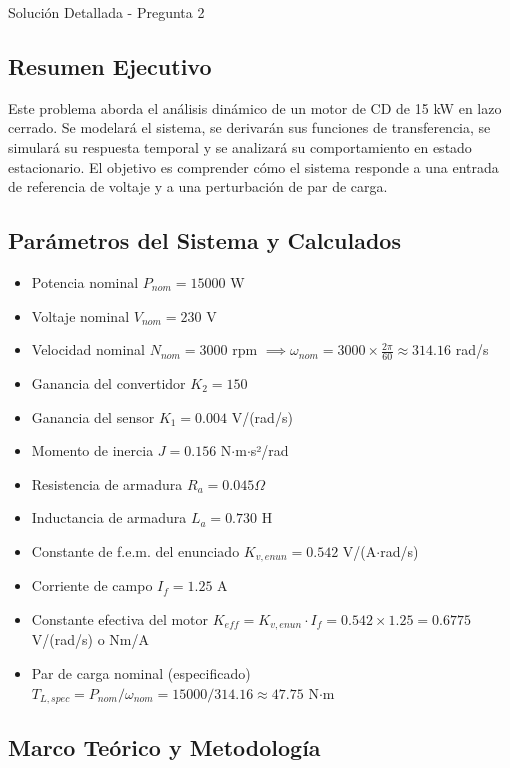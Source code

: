 \documentclass[12pt]{article}
\begin{document}
\begin{solutionbox}{Solución Detallada - Pregunta 2}

\subsection*{Resumen Ejecutivo}
Este problema aborda el análisis dinámico de un motor de CD de 15 kW en lazo cerrado. Se modelará el sistema, se derivarán sus funciones de transferencia, se simulará su respuesta temporal y se analizará su comportamiento en estado estacionario. El objetivo es comprender cómo el sistema responde a una entrada de referencia de voltaje y a una perturbación de par de carga.

\subsection*{Parámetros del Sistema y Calculados}
\begin{itemize}
    \item Potencia nominal $P_{nom} = 15000$ W
    \item Voltaje nominal $V_{nom} = 230$ V
    \item Velocidad nominal $N_{nom} = 3000$ rpm $\implies \omega_{nom} = 3000 \times \frac{2\pi}{60} \approx 314.16$ rad/s
    \item Ganancia del convertidor $K_2 = 150$
    \item Ganancia del sensor $K_1 = 0.004$ V/(rad/s)
    \item Momento de inercia $J = 0.156$ N$\cdot$m$\cdot$s²/rad
    \item Resistencia de armadura $R_a = 0.045 \Omega$
    \item Inductancia de armadura $L_a = 0.730$ H
    \item Constante de f.e.m. del enunciado $K_{v,enun} = 0.542$ V/(A$\cdot$rad/s)
    \item Corriente de campo $I_f = 1.25$ A
    \item Constante efectiva del motor $K_{eff} = K_{v,enun} \cdot I_f = 0.542 \times 1.25 = 0.6775$ V/(rad/s) o Nm/A
    \item Par de carga nominal (especificado) $T_{L,spec} = P_{nom} / \omega_{nom} = 15000 / 314.16 \approx 47.75$ N$\cdot$m
\end{itemize}

\subsection*{Marco Teórico y Metodología}

\end{solutionbox}
\end{document}
